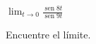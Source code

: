 \item $\displaystyle \lim_{t \to 0} \frac{\operatorname{sen} 8t}{\operatorname{sen} 9t}$
\par
Encuentre el límite.
